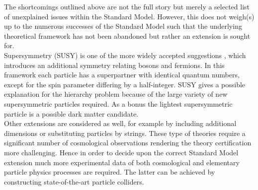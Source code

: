 The shortcomings outlined above are not the full story but merely a selected list of unexplained issues within the Standard Model. 
However, this does not weigh(s) up to the numerous successes of the Standard Model such that the underlying theoretical framework has not been abandoned but rather an extension is sought for.
\\
Supersymmetry (SUSY) is one of the more widely accepted suggestions%
, which introduces an additional symmetry relating bosons and fermions.
In this framework each particle has a superpartner with identical quantum numbers, except for the spin parameter differing by a half-integer.
SUSY gives a possible explanation for the hierarchy problem because of the large variety of new supersymmetric particles required. 
As a bonus the lightest supersymmetric particle is a possible dark matter candidate.
\\
Other extensions are considered as well, for example by including additional dimensions or substituting particles by strings. These type of theories require a significant number of cosmological observations rendering the theory certification more challenging. %
Hence in order to decide upon the correct Standard Model extension much more experimental data of both cosmological and elementary particle physics processes are required. The latter can be achieved by constructing state-of-the-art particle colliders.

